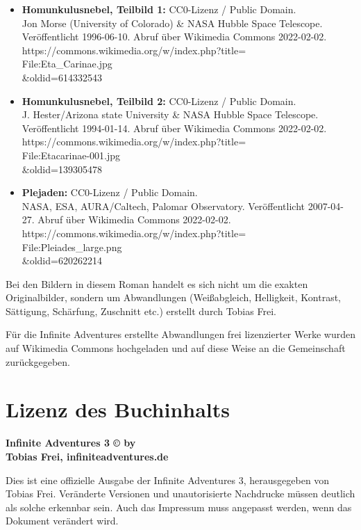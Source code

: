 \begin{itemize}
    \item \textbf{Homunkulusnebel, Teilbild 1:} CC0-Lizenz / Public Domain.\\ Jon Morse (University of Colorado) \& NASA Hubble Space Telescope. Veröffentlicht 1996-06-10. Abruf über Wikimedia Commons 2022-02-02.\\ https://commons.wikimedia.org/w/index.php?title=\\File:Eta\_Carinae.jpg\\\&oldid=614332543
    \item \textbf{Homunkulusnebel, Teilbild 2:} CC0-Lizenz / Public Domain.\\ J. Hester/Arizona state University \& NASA Hubble Space Telescope. Veröffentlicht 1994-01-14. Abruf über Wikimedia Commons 2022-02-02.\\ https://commons.wikimedia.org/w/index.php?title=\\File:Etacarinae-001.jpg\\\&oldid=139305478
    \item \textbf{Plejaden:} CC0-Lizenz / Public Domain.\\ NASA, ESA, AURA/Caltech, Palomar Observatory. Veröffentlicht 2007-04-27. Abruf über Wikimedia Commons 2022-02-02.\\ https://commons.wikimedia.org/w/index.php?title=\\File:Pleiades\_large.png\\\&oldid=620262214
\end{itemize}

Bei den Bildern in diesem Roman handelt es sich nicht um die exakten Originalbilder, sondern um Abwandlungen (Weißabgleich, Helligkeit, Kontrast, Sättigung, Schärfung, Zuschnitt etc.) erstellt durch Tobias Frei.

Für die Infinite Adventures erstellte Abwandlungen frei lizenzierter Werke wurden auf Wikimedia Commons hochgeladen und auf diese Weise an die Gemeinschaft zurückgegeben.


\chapter{Lizenz des Buchinhalts}

\textbf{Infinite Adventures 3 © by\\ Tobias Frei, infiniteadventures.de}

Dies ist eine offizielle Ausgabe der Infinite Adventures 3, herausgegeben von Tobias Frei. Veränderte Versionen und unautorisierte Nachdrucke müssen deutlich als solche erkennbar sein. Auch das Impressum muss angepasst werden, wenn das Dokument verändert wird.

